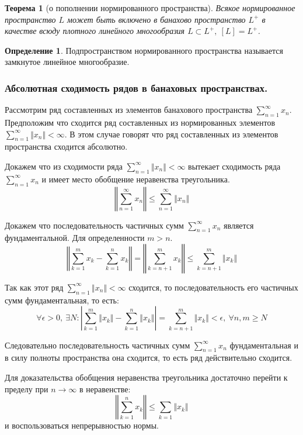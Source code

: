 \documentclass[14pt,a4paper]{extarticle}
\newtheorem{theorem}{Теорема}[section]
\theoremstyle{definition}
\newtheorem{definition}{Определение}[section]
\theoremstyle{remark}
\newcommand{\sep}{ , \ \allowbreak }
\renewcommand{\[}{\begin{dmath*}[compact]}
\renewcommand{\]}{\end{dmath*}}
\begin{document}
\begin{theorem}[о пополнении нормированного пространства]
  Всякое нормированное пространство $L$ может быть включено в банахово
  пространство $L^+$ в качестве всюду плотного линейного многообразия
  $L \subset L^+ \sep [L]=L^+$.
\end{theorem}

\begin{definition}
  Подпространством нормированного пространства называется
  замкнутое линейное многообразие.
\end{definition}

\subsubsection{Абсолютная сходимость рядов в банаховых пространствах.}

Рассмотрим ряд составленных из элементов банахового пространства
$\sum_{n=1}^\infty x_n$.
Предположим что сходится ряд составленных из нормированных элементов
$\sum_{n=1}^\infty \Vert x_n \Vert < \infty$.
В этом случае говорят что ряд составленных из элементов пространства
сходится абсолютно.

Докажем что из сходимости ряда $\sum_{n=1}^\infty \Vert x_n \Vert < \infty$
вытекает сходимость ряда $\sum_{n=1}^\infty x_n$ и имеет место обобщение
неравенства треугольника.
\[ \left \Vert \sum_{n=1}^\infty x_n \right \Vert \leq
\sum_{n=1}^\infty \Vert x_n \Vert  \]

Докажем что последовательность частичных сумм $\sum_{n=1}^\infty x_n$ является
фундаментальной.
Для определенности $m>n$.
\[ {\left \Vert \sum_{k=1}^m x_k - \sum_{k=1}^n x_k \right \Vert} \allowbreak
= {\left \Vert \sum_{k=n+1}^m x_k \right \Vert} \allowbreak
\leq {\sum_{k=n+1}^m \Vert x_k \Vert} \]

Так как этот ряд $\sum_{n=1}^\infty \Vert x_n \Vert < \infty$ сходится,
то последовательность его частичных сумм фундаментальная, то есть:
\[ {\forall \epsilon > 0} \sep \exists N:
{\left| \sum_{k=1}^m \Vert x_k \Vert - \sum_{k=1}^n \Vert x_k \Vert \right|}
\allowbreak = {\sum_{k=n+1}^m \Vert x_k \Vert < \epsilon}
\sep {\forall n,m \geq N} \]

Следовательно последовательность частичных сумм $\sum_{n=1}^\infty x_n$
фундаментальная и в силу полноты пространства она сходится,
то есть ряд действительно сходится.

Для доказательства обобщения неравенства треугольника достаточно перейти к
пределу при $n \to \infty$ в неравенстве:
\[ \left \Vert \sum_{k=1}^n x_k \right \Vert \leq \sum_{k=1} \Vert x_k \Vert \]
и воспользоваться непрерывностью нормы.
\end{document}
